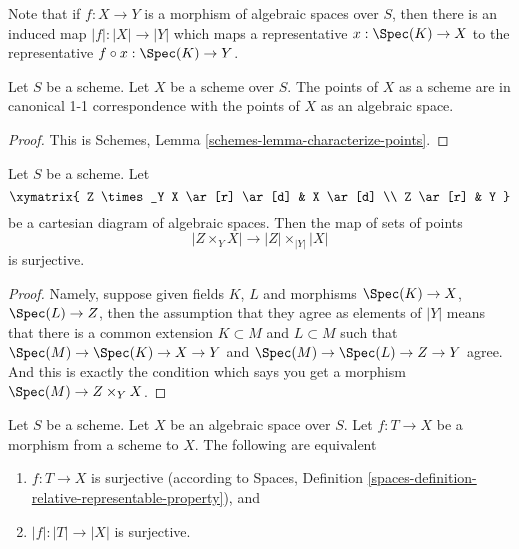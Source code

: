 \noindent
Note that if $f : X \to Y$ is a morphism of algebraic spaces
over $S$, then there is an induced map $|f| : |X| \to |Y|$ which
maps a representative $x : \Spec(K) \to X$ to the representative
$f \circ x : \Spec(K) \to Y$.

\begin{lemma}
\label{lemma-scheme-points}
Let $S$ be a scheme. Let $X$ be a scheme over $S$.
The points of $X$ as a scheme are in canonical 1-1 correspondence
with the points of $X$ as an algebraic space.
\end{lemma}

\begin{proof}
This is Schemes, Lemma \ref{schemes-lemma-characterize-points}.
\end{proof}

\begin{lemma}
\label{lemma-points-cartesian}
Let $S$ be a scheme. Let
$$
\xymatrix{
Z \times_Y X \ar[r] \ar[d] & X \ar[d] \\
Z \ar[r] & Y
}
$$
be a cartesian diagram of algebraic spaces. Then the map of sets
of points
$$
|Z \times_Y X|
\longrightarrow
|Z| \times_{|Y|} |X|
$$
is surjective.
\end{lemma}

\begin{proof}
Namely, suppose given fields $K$, $L$ and morphisms
$\Spec(K) \to X$, $\Spec(L) \to Z$, then the
assumption that they agree as elements of $|Y|$ means that
there is a common extension $K \subset M$ and $L \subset M$
such that
$\Spec(M) \to \Spec(K) \to X \to Y$ and
$\Spec(M) \to \Spec(L) \to Z \to Y$ agree.
And this is exactly the condition which says you get a
morphism $\Spec(M) \to Z \times_Y X$.
\end{proof}

\begin{lemma}
\label{lemma-characterize-surjective}
Let $S$ be a scheme.
Let $X$ be an algebraic space over $S$.
Let $f : T \to X$ be a morphism from a scheme to $X$.
The following are equivalent
\begin{enumerate}
\item $f : T \to X$ is surjective (according to
Spaces, Definition \ref{spaces-definition-relative-representable-property}),
and
\item $|f| : |T| \to |X|$ is surjective.
\end{enumerate}
\end{lemma}

